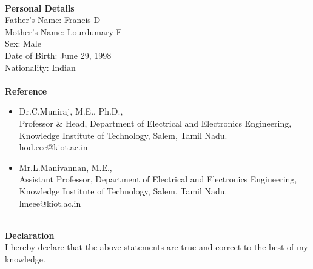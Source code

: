 \documentclass{article}
\begin{document}
\Large \textbf{\\Personal Details}\\
\Large \hspace*{20pt}Father’s Name\hspace{20pt}:  \Large Francis D \\ 
\hspace*{20pt}\Large Mother’s Name\hspace{15pt}:  \Large Lourdumary F \\ 
\hspace*{20pt}\Large Sex\hspace{88pt}: \Large Male \\ 
\hspace*{20pt}\Large Date of Birth\hspace{26pt}: \Large June 29, 1998 \\ 
\hspace*{20pt}\Large Nationality\hspace{39pt}: \Large Indian \\ 

\Large \textbf{\\Reference}
\begin{itemize}\item Dr.C.Muniraj, M.E., Ph.D., \\
	Professor \& Head, Department of Electrical and Electronics Engineering,\\
	Knowledge Institute of Technology, Salem, Tamil Nadu.\\
	hod.eee@kiot.ac.in
\end{itemize}

\begin{itemize}
	\item Mr.L.Manivannan, M.E.,\\
	Assistant Professor, Department of Electrical and Electronics Engineering,\\
	Knowledge Institute of Technology, Salem, Tamil Nadu.\\
	lmeee@kiot.ac.in
\end{itemize}

\Large \textbf{\\ Declaration}\\
\hspace*{20pt}\Large I hereby declare that the above statements are true and correct to the best of my knowledge.
\end{document}
